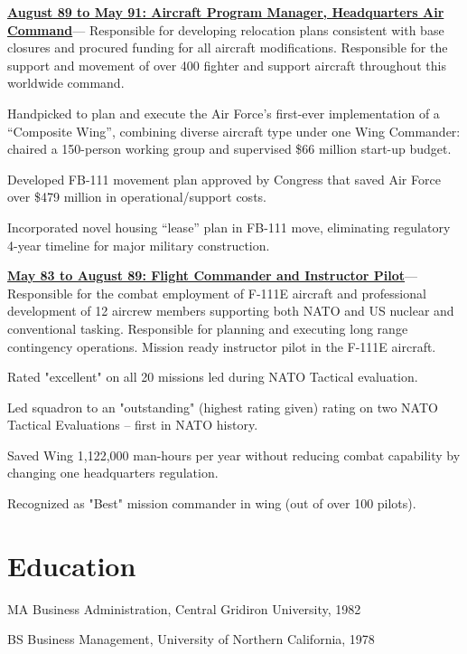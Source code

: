 \documentclass[10pt,letterpaper]{scrartcl}
\newenvironment{accomplishments}{%
	\begin{list}{\textbullet}{%
        \setlength\leftmargin{1em}      %
        \setlength\topsep{0ex}          %
        \setlength\parskip{0.5ex}
        \setstretch{0.8}
        \setlength\listparindent{1em}   %
        \setlength\parsep{0in}          %
        \setlength\itemsep{0.5ex}         %
        }
}{
	\end{list}
}
\newcommand{\accomplishment}{\item }
\newenvironment{job}[4]{%
\vspace{0.0em}
\noindent\textbf{\underline{{#1: #2\ifthenelse{\isempty{#3}}{}{, #3}}}}---#4%
\noindent\begin{accomplishments}{}
}{
\end{accomplishments}
\vspace{1.5em}
}
\newenvironment{degree}[4]{%
\par\noindent#1, #3, #2
}{
\vspace{0.0ex}
}
\begin{document}
\begin{job}{August 89 to May 91}{Aircraft Program Manager, Headquarters Air Command}{}{%
Responsible for developing relocation plans
consistent with base closures and procured funding for all aircraft modifications. Responsible for the support and movement of over
400 fighter and support aircraft throughout this worldwide command.
}
\accomplishment Handpicked to plan and execute the Air Force’s first-ever implementation of a “Composite Wing”, combining diverse aircraft type
under one Wing Commander: chaired a 150-person working group and supervised \$66 million start-up budget.
\accomplishment Developed FB-111 movement plan approved by Congress that saved Air Force over \$479 million in operational/support costs.
\accomplishment Incorporated novel housing “lease” plan in FB-111 move, eliminating regulatory 4-year timeline for major military construction.
\end{job}

\begin{job}{May 83 to August 89}{Flight Commander and Instructor Pilot}{}{%
Responsible for the combat employment of F-111E aircraft and
professional development of 12 aircrew members supporting both NATO and US nuclear and conventional tasking. Responsible for
planning and executing long range contingency operations. Mission ready instructor pilot in the F-111E aircraft.
}
\accomplishment Rated "excellent" on all 20 missions led during NATO Tactical evaluation.
\accomplishment Led squadron to an "outstanding" (highest rating given) rating on two NATO Tactical Evaluations – first in NATO history.
\accomplishment Saved Wing 1,122,000 man-hours per year without reducing combat capability by changing one headquarters regulation.
\accomplishment Recognized as "Best" mission commander in wing (out of over 100 pilots).
\end{job}


\section*{Education}

\begin{degree}{MA Business Administration}{1982}{Central Gridiron University}{Seol, South Korea}\end{degree}
\begin{degree}{BS Business Management}{1978}{University of Northern California}{Santa Rosa, CA}\end{degree}
\end{document}
